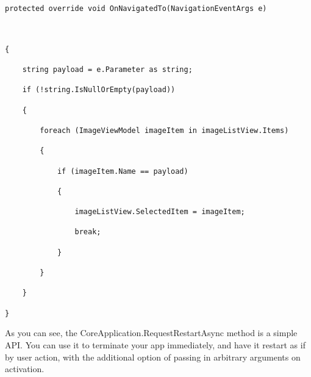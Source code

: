 \begin{lstlisting}[style=CSharpStyle]
protected override void OnNavigatedTo(NavigationEventArgs e)



{
	
	string payload = e.Parameter as string;
	
	if (!string.IsNullOrEmpty(payload))
	
	{
		
		foreach (ImageViewModel imageItem in imageListView.Items)
		
		{
			
			if (imageItem.Name == payload)
			
			{
				
				imageListView.SelectedItem = imageItem;
				
				break;
				
			}
			
		}
		
	}
	
}
\end{lstlisting}

As you can see, the CoreApplication.RequestRestartAsync method is a simple API. You can use it to terminate your app immediately, and have it restart as if by user action, with the additional option of passing in arbitrary arguments on activation.